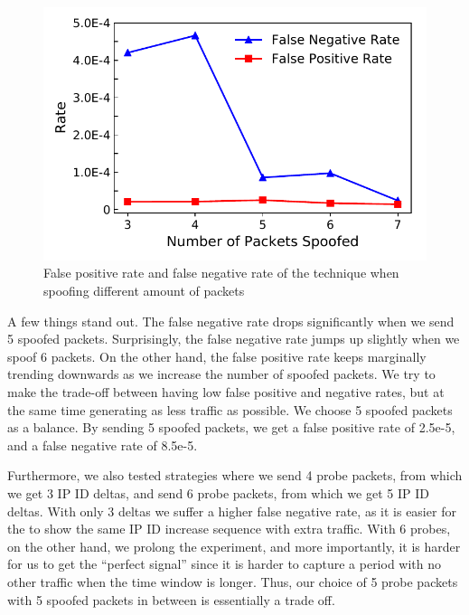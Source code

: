 
\begin{figure}[t]
\centering
\includegraphics[width=0.85\columnwidth]{images/false_positive_negative.pdf}
\caption{False positive rate and false negative rate of the technique when
spoofing different amount of packets}
\label{fig:fp_fn_analysis}
\end{figure}

A few things stand out. The false negative rate drops significantly when we
send 5 spoofed packets. Surprisingly, the false negative rate jumps up
slightly when we spoof 6 packets. On the other hand, the false positive rate
keeps marginally trending downwards as we increase the number of spoofed
packets. We try to make the trade-off between having low false positive and
negative rates, but at the same time generating as less traffic as possible.
We choose 5 spoofed packets as a balance. By sending 5 spoofed packets, we
get a false positive rate of 2.5e-5, and a false negative rate of 8.5e-5.

Furthermore, we also tested strategies where we send 4 probe packets, from which
we get 3 IP ID deltas, and send 6 probe packets, from which we get 5 IP ID
deltas. With only 3 deltas we suffer a higher false negative rate, as it is
easier for the {} to show the same IP ID increase sequence with
extra traffic. With 6 probes, on the other hand, we prolong the experiment,
and more importantly, it is harder for us to get the ``perfect signal'' since
it is harder to capture a period with no other traffic when the time window
is longer. Thus, our choice of 5 probe packets with 5 spoofed packets in
between is essentially a trade off.

